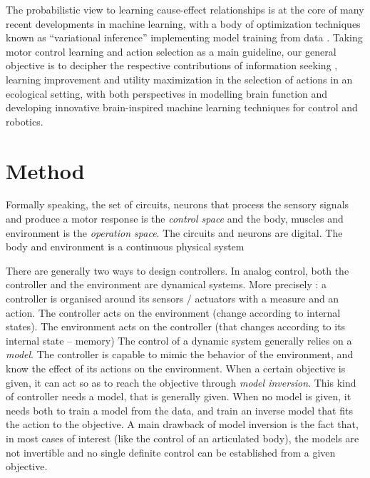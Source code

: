 \documentclass[runningheads]{llncs}
\begin{document}
The probabilistic view to learning cause-effect relationships is at the core of many recent developments in machine learning, with a body of optimization techniques known as “variational inference” implementing model training from data \cite{kingma2013auto}. 
Taking motor control learning and action selection as a main guideline, our general objective is to decipher the respective contributions of information seeking \cite{mohamed2015variational}, learning improvement \cite{schmidhuber1991curious} and utility maximization \cite{sutton2018reinforcement} in the selection of actions in an ecological setting, with both perspectives in modelling brain function and developing innovative brain-inspired machine learning techniques for control and robotics.

\section{Method}

Formally speaking, the set of circuits, neurons that process the sensory signals and produce a motor response
is the \emph{control space} and the body, muscles and environment is the \emph{operation space}. 
The circuits and neurons are digital.
The body and environment is a continuous physical system 

There are generally two ways to design controllers.  
In analog control, both the controller and the environment are dynamical systems. 
More precisely : a controller is organised around its sensors / actuators with a measure and 
an action. The controller acts on the environment (change according to internal states). 
The environment acts on the controller (that changes according to its internal state -- memory)
The control of a dynamic system generally relies on a \emph{model}. The controller is capable to mimic the
behavior of the environment, and know the effect of its actions on the environment. When a certain objective is given, it can 
act so as to reach the objective through \emph{model inversion}.
This kind of controller needs a model, that is generally given. When no model is given, it needs both to train a model from 
the data, and train an inverse model that fits the action to the objective.
A main drawback of model inversion is the fact that, in most cases of interest (like the control of an articulated body), the models are not invertible and no single definite control can be established from a given objective. 
\end{document}
